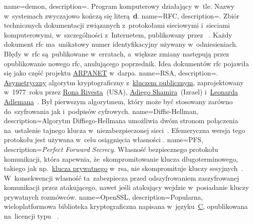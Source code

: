 {
	name={demon},
	description={. Program komputerowy działający w~tle. Nazwy  w~systemach  zwyczajowo kończą się literą~\textbf{d}.}
}
{
	name={RFC},
	description={. Zbiór technicznych dokumentacji związanych z~protokołami sieciowymi i~sieciami komputerowymi, w~szczególności z~Internetem, publikowany przez ~\cite{rfc-editor}. Każdy dokument \gls{rfc} ma~unikatowy numer identyfikacyjny używany w~odniesieniach. Błędy w~\gls{rfc} są~publikowane w~erratach, a~większe zmiany następują przez opublikowanie nowego \gls{rfc}, anulującego poprzednik. Idea dokumentów \gls{rfc} pojawiła się jako część projektu \href{https://en.wikipedia.org/wiki/ARPANET}{ARPANET} w~\gls{darpa}.}
}
{
	name={RSA},
	description={. \href{https://en.wikipedia.org/wiki/Public-key_cryptography}{Asymetryczny} algorytm kryptograficzny z~\href{https://en.wikipedia.org/wiki/Public-key_cryptography}{kluczem publicznym}, zaprojektowany w~1977~roku przez \href{https://en.wikipedia.org/wiki/Ron_Rivest}{Rona Rivesta}~(USA), \href{https://en.wikipedia.org/wiki/Adi_Shamir}{Adiego Shamira}~(Izrael) i~\href{https://en.wikipedia.org/wiki/Leonard_Adleman}{Leonarda Adlemana}~\cite{wiki:rsa,rsa}. Był pierwszym algorytmem, który może być stosowany zarówno do~szyfrowania jak i~podpisów cyfrowych.}
}
{
	name={Diffie-Hellman},
	description={Algorytm Diffiego-Hellmana umożliwia dwóm stronom połączenia na~ustalenie tajnego klucza w~niezabezpieczonej sieci~\cite{mimuw-ssl-w04}. Efemeryczna wersja tego protokołu jest używana w~celu osiągnięcia własności .}
}
{
	name={PFS},
	description={\emph{Perfect Forward Secrecy}. Własność bezpiecznego protokołu komunikacji, która zapewnia, że~skompromitowanie klucza długoterminowego, takiego jak np.~\href{https://en.wikipedia.org/wiki/Public-key_cryptography}{klucza prywatnego} w~\gls{rsa}, nie skompromituje kluczy sesyjnych~\cite{wiki:pfs}. W~konsekwencji własność ta~zabezpiecza przed odszyfrowaniem zaszyfrowanej komunikacji przez atakującego, nawet jeśli atakujący wejdzie w~posiadanie kluczy prywatnych rozmówców.}
}
{
	name={OpenSSL},
	description={Popularna, wieloplatformowa biblioteka kryptograficzna napisana w~języku~\href{https://en.wikipedia.org/wiki/C_(programming_language)}{C}, opublikowana na~licencji typu ~\cite{openssl}.}
}
